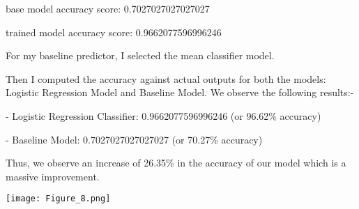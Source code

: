 \documentclass[10pt]{article}
\begin{document}
base model accuracy score:  0.7027027027027027 

trained model accuracy score:  0.9662077596996246

For my baseline predictor, I selected the mean classifier model.

Then I computed the accuracy against actual outputs for both the models: Logistic Regression Model and Baseline Model. We observe the following results:-


- Logistic Regression Classifier: 0.9662077596996246 (or 96.62\% accuracy)

- Baseline Model: 0.7027027027027027 (or 70.27\% accuracy)

Thus, we observe an increase of 26.35\% in the accuracy of our model which is a massive improvement.

\begin{center}
  \texttt{[image: Figure\_8.png]}
\end{center}
\end{document}
